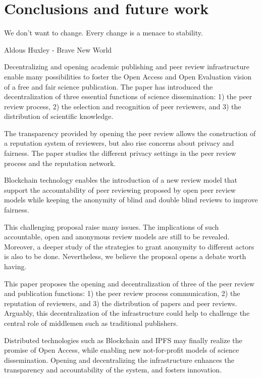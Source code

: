 \chapter{Conclusions and future work}

\begin{FraseCelebre}
  \begin{Frase}
    We don't want to change. Every change is a menace to stability.
  \end{Frase}
  \begin{Fuente}
    Aldous Huxley - Brave New World
  \end{Fuente}
\end{FraseCelebre}

Decentralizing and opening academic publishing and peer review infrastructure
enable many possibilities to foster the Open Access and Open Evaluation vision
of a free and fair science publication. The paper has introduced the
decentralization of three essential functions of science dissemination: 1) the
peer review process, 2) the selection and recognition of peer reviewers, and 3)
the distribution of scientific knowledge.

The transparency provided by opening the peer review allows the construction of
a reputation system of reviewers, but also rise concerns about privacy and
fairness. The paper studies the different privacy settings in the peer review
process and the reputation network.

Blockchain technology enables the introduction of a new review model that
support the accountability of peer reviewing proposed by open peer review models
while keeping the anonymity of blind and double blind reviews to improve
fairness.

This challenging proposal raise many issues. The implications of such
accountable, open and anonymous review models are still to be revealed.
Moreover, a deeper study of the strategies to grant anonymity to different
actors is also to be done. Nevertheless, we believe the proposal opens a debate
worth having.

This paper proposes the opening and decentralization of three of the peer review
and publication functions: 1) the peer review process communication, 2) the
reputation of reviewers, and 3) the distribution of papers and peer reviews.
Arguably, this decentralization of the infrastructure could help to challenge
the central role of middlemen such as traditional publishers.

Distributed technologies such as Blockchain and IPFS may finally realize the
promise of Open Access, while enabling new not-for-profit models of science
dissemination. Opening and decentralizing the infrastructure enhances the
transparency and accountability of the system, and fosters innovation.

